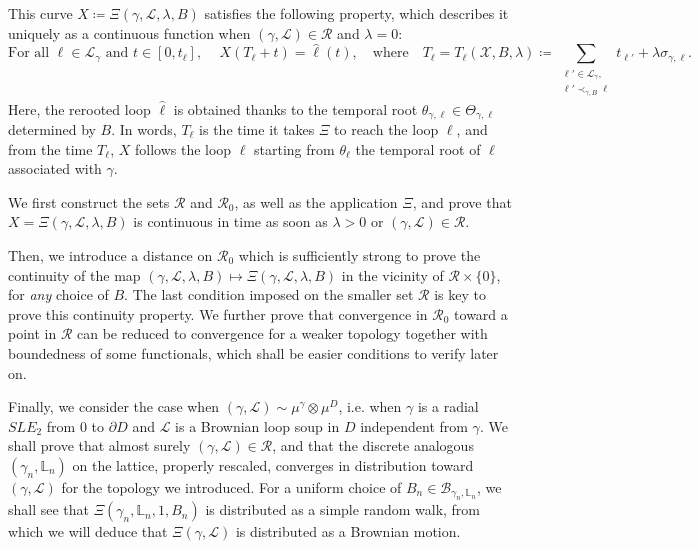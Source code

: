 \documentclass[11pt]{article}
\def\Conf{{\mathscr{R}}}
\def\Att{{\Xi}}
\begin{document}
This curve $X\coloneqq\Att(\gamma,\mathcal{L},\lambda,B)$ satisfies the following property, which describes it uniquely as a continuous function when  $(\gamma,\mathcal{L})\in \Conf$ and $\lambda=0$:
 \[\mbox{For all $\ell\in \mathcal{L}_\gamma$ and $t\in[0,t_\ell]$, }\quad  X(T_\ell+t )=\hat{\ell}(t), \quad\mbox{where}\quad T_\ell=T_\ell(\mathcal{X},B,\lambda)\coloneqq
\sum_{\substack{ \ell' \in \mathcal{L}_{\gamma},\\\ell'\prec_{\gamma,B} \ell} } t_{\ell'}
   +\lambda \sigma_{\gamma,\ell}.\]
   Here, %
	 the rerooted loop $\hat{\ell}$ is obtained thanks to the temporal root $\theta_{\gamma,\ell}\in \Theta_{\gamma,\ell}$ determined by $B$.
In words, $T_\ell$ is the time it takes $\Att$ to reach the loop $\ell$, and from the time $T_\ell$, $X$ follows the loop $\ell$ starting from $\theta_\ell$ the temporal root of $\ell$ associated with $\gamma$.

\smallskip

We first construct the sets $\Conf$ and $\Conf_0$, as well as the application $\Att$, and prove that $X=\Att(\gamma,\mathcal{L},\lambda,B)$ is continuous in time as soon as $\lambda>0$ or $(\gamma,\mathcal{L})\in \Conf$.

Then, we introduce a distance on $\mathcal{R}_0$ which is sufficiently strong to prove the continuity of the map $(\gamma,\mathcal{L},\lambda,B)\mapsto \Att(\gamma,\mathcal{L},\lambda,B)$ in the vicinity of $\Conf\times\{0\}$, for {\it any} choice of $B$. The last condition imposed on the smaller set $\Conf$ is key to prove this continuity property. We further prove that convergence in $\mathcal{R}_0$ toward a point in $\Conf$ can be reduced to convergence for a weaker topology together with boundedness of some functionals, which shall be easier conditions to verify later on.

Finally, we consider the case when $(\gamma,\mathcal{L})\sim \mu^\gamma\otimes \mu^D$, i.e. when $\gamma$ is a radial $SLE_2$ from $0$ to $\partial D$ and $\mathcal{L}$ is a Brownian loop soup in $D$ independent from $\gamma$. We shall prove that almost surely $(\gamma,\mathcal{L})\in \Conf$, and that the discrete analogous $(\gamma_n,\mathbb{L}_n)$ on the lattice, properly rescaled, converges in distribution toward $(\gamma,\mathcal{L})$ for the topology we introduced. For a uniform choice of $B_n\in \mathcal{B}_{\gamma_n,\mathbb{L}_n}$,
we shall see that $\Att(\gamma_n,\mathbb{L}_n,1,B_n)$ is distributed as a simple random walk, from which we will deduce that $\Att(\gamma,\mathcal{L})$ is distributed as a Brownian motion.
\end{document}
